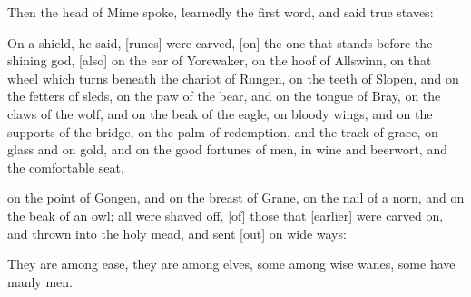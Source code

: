 Then the head of Mime spoke, learnedly the first word, and said true staves:

On a shield, he said, [runes] were carved, [on] the one that stands before the shining god, [also] on the ear of Yorewaker, on the hoof of Allswinn, on that wheel which turns beneath the chariot of Rungen, on the teeth of Slopen, and on the fetters of sleds, on the paw of the bear, and on the tongue of Bray, on the claws of the wolf, and on the beak of the eagle, on bloody wings, and on the supports of the bridge, on the palm of redemption, and the track of grace, on glass and on gold, and on the good fortunes of men, in wine and beerwort, and the comfortable seat,

on the point of Gongen, and on the breast of Grane, on the nail of a norn, and on the beak of an owl; all were shaved off, [of] those that [earlier] were carved on, and thrown into the holy mead, and sent [out] on wide ways:

They are among ease, they are among elves, some among wise wanes, some have manly men.

